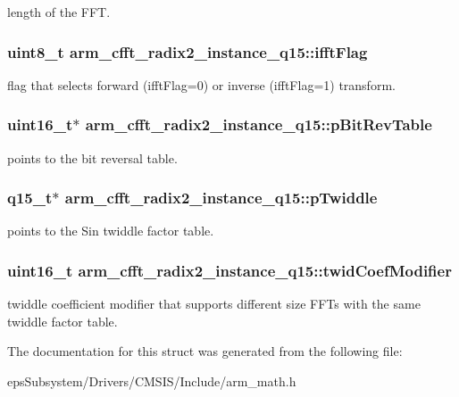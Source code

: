length of the F\-F\-T. \hypertarget{structarm__cfft__radix2__instance__q15_ab5c073286bdd2f6e2bf783ced36bf1de}{
\subsubsection[{ifft\-Flag}]{\setlength{\rightskip}{0pt plus 5cm}uint8\-\_\-t arm\-\_\-cfft\-\_\-radix2\-\_\-instance\-\_\-q15\-::ifft\-Flag}}\label{structarm__cfft__radix2__instance__q15_ab5c073286bdd2f6e2bf783ced36bf1de}
flag that selects forward (ifft\-Flag=0) or inverse (ifft\-Flag=1) transform. \hypertarget{structarm__cfft__radix2__instance__q15_ab88afeff6493be3c8b5e4530efa82d51}{
\subsubsection[{p\-Bit\-Rev\-Table}]{\setlength{\rightskip}{0pt plus 5cm}uint16\-\_\-t$\ast$ arm\-\_\-cfft\-\_\-radix2\-\_\-instance\-\_\-q15\-::p\-Bit\-Rev\-Table}}\label{structarm__cfft__radix2__instance__q15_ab88afeff6493be3c8b5e4530efa82d51}
points to the bit reversal table. \hypertarget{structarm__cfft__radix2__instance__q15_a3809dd15e7cbf1a054c728cfbbb0cc5a}{
\subsubsection[{p\-Twiddle}]{\setlength{\rightskip}{0pt plus 5cm}q15\-\_\-t$\ast$ arm\-\_\-cfft\-\_\-radix2\-\_\-instance\-\_\-q15\-::p\-Twiddle}}\label{structarm__cfft__radix2__instance__q15_a3809dd15e7cbf1a054c728cfbbb0cc5a}
points to the Sin twiddle factor table. \hypertarget{structarm__cfft__radix2__instance__q15_a6f2ab87fb4c568656e1f92f687b5c850}{
\subsubsection[{twid\-Coef\-Modifier}]{\setlength{\rightskip}{0pt plus 5cm}uint16\-\_\-t arm\-\_\-cfft\-\_\-radix2\-\_\-instance\-\_\-q15\-::twid\-Coef\-Modifier}}\label{structarm__cfft__radix2__instance__q15_a6f2ab87fb4c568656e1f92f687b5c850}
twiddle coefficient modifier that supports different size F\-F\-Ts with the same twiddle factor table. 

The documentation for this struct was generated from the following file\-:\begin{DoxyCompactItemize}
\item 
eps\-Subsystem/\-Drivers/\-C\-M\-S\-I\-S/\-Include/arm\-\_\-math.\-h\end{DoxyCompactItemize}
